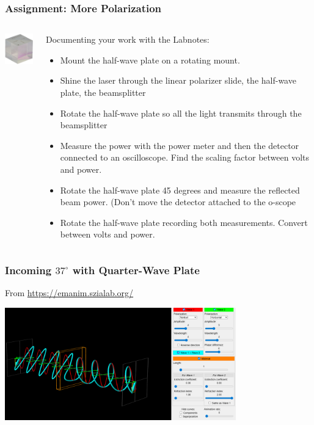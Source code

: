 \documentclass{beamer}
\begin{document}
\begin{frame}\frametitle{Assignment: More Polarization}
\begin{columns}
\begin{column}{2cm}
\begin{center}
\includegraphics[width=2.5cm]{fig/PBS252b.jpg}
\end{center}
\end{column}
\begin{column}{8.5cm}
Documenting your work with the Labnotes:
\begin{itemize}
\item Mount the half-wave plate on a rotating mount.
\item Shine the laser through the linear polarizer slide, the half-wave plate, the beamsplitter
\item Rotate the half-wave plate so all the light transmits through the beamsplitter
\item Measure the power with the power meter and then the detector connected to an oscilloscope. Find the scaling factor between volts and power.
\item Rotate the half-wave plate 45 degrees and measure the reflected beam power. (Don't move the detector attached to the o-scope
\item Rotate the half-wave plate recording both measurements. Convert between volts and power.
\end{itemize}
\end{column}
\end{columns}
\end{frame}



\begin{frame}\frametitle{Incoming $37^\circ$ with Quarter-Wave Plate}
From \url{https://emanim.szialab.org/}

\begin{center}
\includegraphics[width=10cm]{fig/waveplate_37_4.png}
\end{center}
\end{frame}
\end{document}

